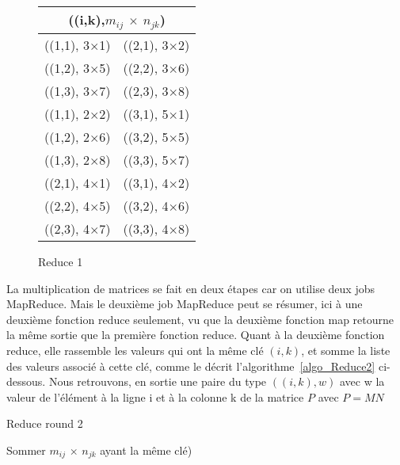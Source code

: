 \begin{figure}[H]
  \begin{center}
    \begin{tabular}{|c|c|}
      \hline
      \multicolumn{2}{|c|}{((i,k),$m_{ij}$ $\times$ $n_{jk}$)} \\
      \hline
      ((1,1), 3$\times$1) & ((2,1), 3$\times$2) \\
      ((1,2), 3$\times$5) & ((2,2), 3$\times$6) \\
      ((1,3), 3$\times$7) & ((2,3), 3$\times$8) \\
      ((1,1), 2$\times$2) & ((3,1), 5$\times$1) \\
      ((1,2), 2$\times$6) & ((3,2), 5$\times$5) \\
      ((1,3), 2$\times$8) & ((3,3), 5$\times$7) \\
      ((2,1), 4$\times$1) & ((3,1), 4$\times$2) \\
      ((2,2), 4$\times$5) & ((3,2), 4$\times$6) \\
      ((2,3), 4$\times$7) & ((3,3), 4$\times$8) \\
      \hline
    \end{tabular}
    \caption{Reduce 1}
    \label{reduce1}
  \end{center}
\end{figure}

\littlesectionspace
La multiplication de matrices se fait en deux étapes car on utilise deux jobs MapReduce. Mais le deuxième job MapReduce peut se résumer, ici  
à une deuxième fonction reduce seulement, vu que la deuxième fonction map retourne la même sortie que la première fonction reduce.
Quant à la deuxième fonction reduce, elle rassemble les valeurs qui ont la même clé $(i,k)$, et somme la liste des valeurs associé à cette clé, 
comme le décrit l'algorithme~\ref{algo_Reduce2} ci-dessous. Nous retrouvons, en sortie une paire du type $((i,k),w)$  avec w la valeur de l'élément à
la ligne i et à la colonne k de la matrice $P$ avec $P=MN$

\begin{algorithm}[H]
  \caption{Reduce round 2}
  \label{algo_Reduce2}
  \begin{algorithmic}
    \State Sommer $m_{ij}$ $\times$ $n_{jk}$ ayant la même clé)
    \EndFor
  \end{algorithmic}
\end{algorithm}
\littlesectionspace

